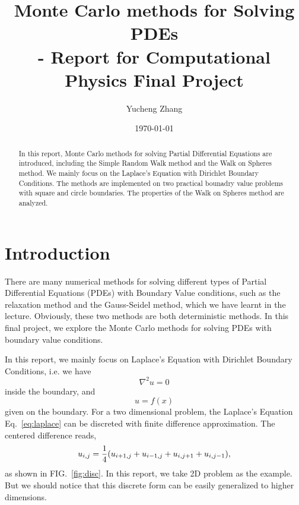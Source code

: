 \documentclass[aps, prl, preprint, groupedaddress]{revtex4-1}
\begin{document}
    
\title{Monte Carlo methods for Solving PDEs\\- Report for Computational Physics Final Project}
\author{Yucheng Zhang}
\date{\today}
    
\begin{abstract}
    In this report, Monte Carlo methods for solving Partial Differential Equations are introduced, including the Simple Random Walk method and the Walk on Spheres method. We mainly focus on the Laplace's Equation with Dirichlet Boundary Conditions. The methods are implemented on two practical bounadry value problems with square and circle boundaries. The properties of the Walk on Spheres method are analyzed.
\end{abstract}
    
\maketitle

\section{Introduction}

There are many numerical methods for solving different types of Partial Differential Equations (PDEs) with Boundary Value conditions, such as the relaxation method and the Gauss-Seidel method, which we have learnt in the lecture. Obviously, these two methods are both deterministic methods. In this final project, we explore the Monte Carlo methods for solving PDEs with boundary value conditions. 

In this report, we mainly focus on Laplace's Equation with Dirichlet Boundary Conditions, i.e. we have
\begin{equation}
    \nabla^2 u = 0
    \label{eq:laplace}
\end{equation} inside the boundary, and
\begin{equation}
    u = f(x)
\end{equation} given on the boundary. For a two dimensional problem, the Laplace's Equation Eq.~\ref{eq:laplace} can be discreted with finite difference approximation. The centered difference reads,
\begin{equation}
    u_{i,j} = \frac{1}{4} \qty(u_{i+1,j}+u_{i-1,j}+u_{i,j+1}+u_{i,j-1}),
\end{equation}
as shown in FIG.~\ref{fig:disc}. In this report, we take 2D problem as the example. But we should notice that this discrete form can be easily generalized to higher dimensions.
\end{document}
